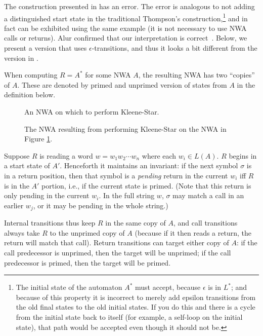 The construction presented in \cite{JACM:AM2009} has an error. The error is
analogous to not adding a distinguished start state in the traditional
Thompson's construction,\footnote{The initial state of the automaton $A^*$
  must accept, because $\epsilon$ is in $L^*$; and because of this property it is
  incorrect to merely add epsilon transitions from the old final states to
  the old initial states. If you do this and there is a cycle from the
  initial state back to itself (for example, a self-loop on the initial
  state), that path would be accepted even though it should not be.} and in
fact can be exhibited using the same example (it is not necessary to use NWA
calls or returns). Alur confirmed that our interpretation is
correct~\cite{AlurNwaStarBroken}. Below, we present
a version that uses $\epsilon$-transitions, and thus it looks a bit
different from the version in \cite{JACM:AM2009}.

When computing $R = A^*$ for some
NWA $A$, the resulting NWA has two ``copies'' of $A$. These are denoted by
primed and unprimed version of states from $A$ in the definition below. 

\begin{figure}[p]
  \centering
  \caption{An NWA on which to perform Kleene-Star.}
  \label{Fi:Star1}
\end{figure}

\begin{figure}[p]
  \centering
  \caption{The NWA resulting from performing Kleene-Star on the NWA in Figure \ref{Fi:Star1}.}
  \label{Fi:Star2}
\end{figure}
\antistupidfloats


Suppose $R$ is reading a word $w=w_1w_2\cdots w_n$ where each $w_i \in
L(A)$. $R$ begins in a start state of $A'$. Henceforth it maintains an
invariant: if the next symbol $\sigma$ is in a return position, then that
symbol is a \emph{pending} return in the current $w_i$ iff $R$ is in the $A'$
portion, i.e., if the current state is primed. (Note that this return is only
pending in the current $w_i$. In the full string $w$, $\sigma$ may match a
call in an earlier $w_j$, or it may be pending in the whole string.)

Internal transitions thus keep $R$ in the same copy of $A$, and call
transitions always take $R$ to the unprimed copy of $A$ (because if it then
reads a return, the return will match that call). Return transitions can
target either copy of $A$: if the call predecessor is unprimed, then the
target will be unprimed; if the call predecessor is primed, then the target
will be primed.

